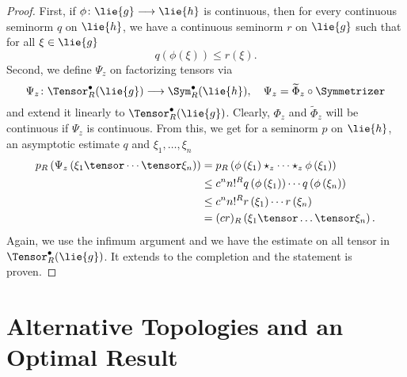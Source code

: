 \begin{proof}
	First, if $\phi \colon \lie{g} \longrightarrow \lie{h}$ is continuous, 
	then for every continuous seminorm $q$ on $\lie{h}$, we have a continuous 
	seminorm $r$ on $\lie{g}$ such that for all $\xi \in \lie{g}$
	\begin{equation*}
		q\left( \phi(\xi) \right)
		\leq
		r(\xi).
	\end{equation*}
	Second, we define $\Psi_z$ on factorizing tensors via
	\begin{equation*}
		\Psi_z \colon
		\Tensor_R^{\bullet}(\lie{g})
		\longrightarrow
		\Sym_R^{\bullet}(\lie{h})
		, \quad
		\Psi_z
		=
		\widetilde{\Phi}_z \circ
		\Symmetrizer
	\end{equation*}
	and extend it linearly to $\Tensor_R^{\bullet}(\lie{g})$. Clearly, 
	$\Phi_z$ and $\widetilde{\Phi}_z$ will be continuous if $\Psi_z$ is 
	continuous. From this, we get for a seminorm $p$ on $\lie{h}$, an 
	asymptotic estimate $q$ and $\xi_1, \ldots, \xi_n$
	\begin{align*}
		p_R\left(
			\Psi_z \left(
				\xi_1 \tensor \cdots \tensor \xi_n
			\right)
		\right)
		& =
		p_R \left(
			\phi \left( \xi_1 \right)
			\star_z \cdots \star_z
			\phi \left( \xi_1 \right)
		\right)
		\\
		& \leq
		c^n n!^R
		q \left( \phi \left( \xi_1 \right) \right)
		\cdots
		q \left( \phi \left( \xi_n \right) \right)
		\\
		& \leq
		c^n n!^R
		r \left( \xi_1 \right)
		\cdots
		r \left( \xi_n \right)
		\\
		& =
		(c r)_R\left( 
			\xi_1 \tensor \ldots \tensor \xi_n
		\right).
	\end{align*}
	Again, we use the infimum argument and we have the estimate on all tensor 
	in $\Tensor_R^{\bullet}(\lie{g})$. It extends to the completion and the 
	statement is proven.
\end{proof}



\section{Alternative Topologies and an Optimal Result}
\label{sec:chap5_Optimality}


